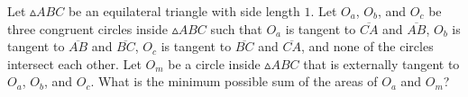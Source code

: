 Let $\vartriangle ABC$ be an equilateral triangle with side length $1$. Let $O_a$, $O_b$, and $O_c$ be three congruent circles inside $\vartriangle ABC$ such that $O_a$ is tangent to $\overline{CA}$ and $\overline{AB}$, $O_b$ is tangent to $\overline{AB}$ and $\overline{BC}$, $O_c$ is tangent to $\overline{BC}$ and $\overline{CA}$, and none of the circles intersect each other. Let $O_m$ be a circle inside $\vartriangle ABC$ that is externally tangent to $O_a$, $O_b$, and $O_c$. What is the minimum possible sum of the areas of $O_a$ and $O_m$?

